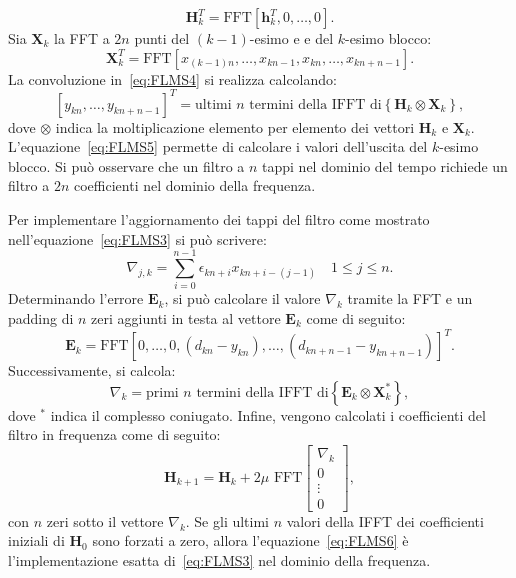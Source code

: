 \documentclass[12pt,a4paper,titlepage]{article}
\begin{document}
\begin{equation*}
\mathbf{H}_k^T = \text{FFT}[\mathbf{h}_k^T, 0, \dots, 0].
\end{equation*} 
Sia $\mathbf{X}_k$ la FFT a $2n$ punti del $(k-1)$-esimo e e del $k$-esimo blocco:
\begin{equation*}
\mathbf{X}_k^T = \text{FFT}[x_{(k-1)n}, \dots, x_{kn-1}, x_{kn}, \dots, x_{kn+n-1}].
\end{equation*}
La convoluzione in~\eqref{eq:FLMS4} si realizza calcolando:
\begin{equation}\label{eq:FLMS5}
[y_{kn}, \dots, y_{kn+n-1}]^T = \text{ultimi }n\text{ termini della IFFT di}\left\{\mathbf{H}_k\otimes \mathbf{X}_k\right\} ,
\end{equation}
dove $\otimes$ indica la moltiplicazione elemento per elemento dei vettori $\mathbf{H}_k$ e $\mathbf{X}_k$. L'equazione~\eqref{eq:FLMS5} permette di calcolare i valori dell'uscita del $k$-esimo blocco. Si può osservare che un filtro a $n$ tappi nel dominio del tempo richiede un filtro a $2n$ coefficienti nel dominio della frequenza.

Per implementare l'aggiornamento dei tappi del filtro come mostrato nell'equazione~\eqref{eq:FLMS3} si può scrivere:
\begin{equation*}
\nabla_{j,k} = \sum_{i = 0}^{n-1}\epsilon_{kn+i}x_{kn+i-(j-1)} \quad 1 \leq j \leq n.
\end{equation*}
Determinando l'errore $\mathbf{E}_k$, si può calcolare il valore $\nabla_{k}$ tramite la FFT e un padding di $n$ zeri aggiunti in testa al vettore $\mathbf{E}_k$ come di seguito:
\begin{equation*}
\mathbf{E}_k = \text{FFT} [0, \dots, 0, (d_{kn}-y_{kn}), \dots, (d_{kn+n-1}-y_{kn+n-1})]^T.
\end{equation*}
Successivamente, si calcola:
\begin{equation*}
\nabla_{k} = \text{primi }n\text{ termini della IFFT di}\left\{\mathbf{E}_k\otimes \mathbf{X}^*_k\right\}  ,
\end{equation*}
dove $^*$ indica il complesso coniugato. Infine, vengono calcolati i coefficienti del filtro in frequenza come di seguito:
\begin{equation}\label{eq:FLMS6}
\mathbf{H}_{k+1} = \mathbf{H}_k + 2 \mu \text{ FFT} 
\begin{bmatrix}
\nabla_k\\
0\\
\vdots\\
0
\end{bmatrix},
\end{equation}
con $n$ zeri sotto il vettore $\nabla_k$. Se gli ultimi $n$ valori della IFFT dei coefficienti iniziali di $\mathbf{H}_0$ sono forzati a zero, allora l'equazione~\eqref{eq:FLMS6} è l'implementazione esatta di~\eqref{eq:FLMS3} nel dominio della frequenza.
\end{document}
